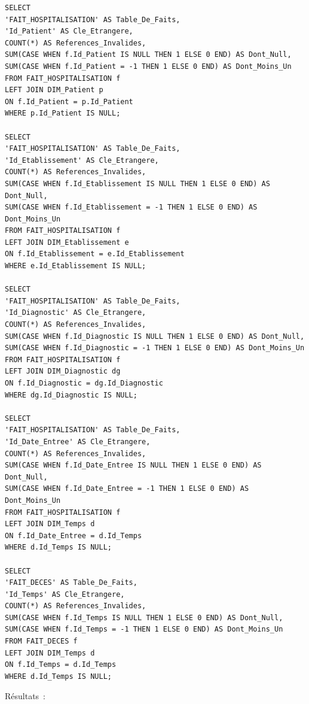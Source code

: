 \begin{verbatim}
SELECT
'FAIT_HOSPITALISATION' AS Table_De_Faits,
'Id_Patient' AS Cle_Etrangere,
COUNT(*) AS References_Invalides,
SUM(CASE WHEN f.Id_Patient IS NULL THEN 1 ELSE 0 END) AS Dont_Null,
SUM(CASE WHEN f.Id_Patient = -1 THEN 1 ELSE 0 END) AS Dont_Moins_Un
FROM FAIT_HOSPITALISATION f
LEFT JOIN DIM_Patient p
ON f.Id_Patient = p.Id_Patient
WHERE p.Id_Patient IS NULL;

SELECT
'FAIT_HOSPITALISATION' AS Table_De_Faits,
'Id_Etablissement' AS Cle_Etrangere,
COUNT(*) AS References_Invalides,
SUM(CASE WHEN f.Id_Etablissement IS NULL THEN 1 ELSE 0 END) AS Dont_Null,
SUM(CASE WHEN f.Id_Etablissement = -1 THEN 1 ELSE 0 END) AS Dont_Moins_Un
FROM FAIT_HOSPITALISATION f
LEFT JOIN DIM_Etablissement e
ON f.Id_Etablissement = e.Id_Etablissement
WHERE e.Id_Etablissement IS NULL;

SELECT
'FAIT_HOSPITALISATION' AS Table_De_Faits,
'Id_Diagnostic' AS Cle_Etrangere,
COUNT(*) AS References_Invalides,
SUM(CASE WHEN f.Id_Diagnostic IS NULL THEN 1 ELSE 0 END) AS Dont_Null,
SUM(CASE WHEN f.Id_Diagnostic = -1 THEN 1 ELSE 0 END) AS Dont_Moins_Un
FROM FAIT_HOSPITALISATION f
LEFT JOIN DIM_Diagnostic dg
ON f.Id_Diagnostic = dg.Id_Diagnostic
WHERE dg.Id_Diagnostic IS NULL;

SELECT
'FAIT_HOSPITALISATION' AS Table_De_Faits,
'Id_Date_Entree' AS Cle_Etrangere,
COUNT(*) AS References_Invalides,
SUM(CASE WHEN f.Id_Date_Entree IS NULL THEN 1 ELSE 0 END) AS Dont_Null,
SUM(CASE WHEN f.Id_Date_Entree = -1 THEN 1 ELSE 0 END) AS Dont_Moins_Un
FROM FAIT_HOSPITALISATION f
LEFT JOIN DIM_Temps d
ON f.Id_Date_Entree = d.Id_Temps
WHERE d.Id_Temps IS NULL;

SELECT
'FAIT_DECES' AS Table_De_Faits,
'Id_Temps' AS Cle_Etrangere,
COUNT(*) AS References_Invalides,
SUM(CASE WHEN f.Id_Temps IS NULL THEN 1 ELSE 0 END) AS Dont_Null,
SUM(CASE WHEN f.Id_Temps = -1 THEN 1 ELSE 0 END) AS Dont_Moins_Un
FROM FAIT_DECES f
LEFT JOIN DIM_Temps d
ON f.Id_Temps = d.Id_Temps
WHERE d.Id_Temps IS NULL;
\end{verbatim}
\noindent Résultats~:


